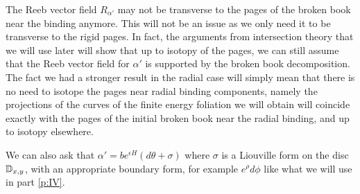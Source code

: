 \documentclass[../main.tex]{subfiles}
\begin{document}
\begin{remark}
The Reeb vector field $R_{\alpha'}$ may not be transverse to the pages of the broken book near the binding anymore. This will not be an issue as we only need it to be transverse to the rigid pages. In fact, the arguments from intersection theory that we will use later will show that up to isotopy of the pages, we can still assume that the Reeb vector field for $\alpha'$ is supported by the broken book decomposition. The fact we had a stronger result in the radial case will simply mean that there is no need to isotope the pages near radial binding components, namely the projections of the curves of the finite energy foliation we will obtain will coincide exactly with the pages of the initial broken book near the radial binding, and up to isotopy elsewhere.
\end{remark}

\begin{remark}
We can also ask that $\alpha' = be^{\epsilon H}(d\theta + \sigma)$ where $\sigma$ is a Liouville form on the disc $\mathbb{D}_{x,y}$, with an appropriate boundary form, for example $e^\rho d\phi$ like what we will use in part \ref{p:IV}.
\end{remark}
\end{document}
